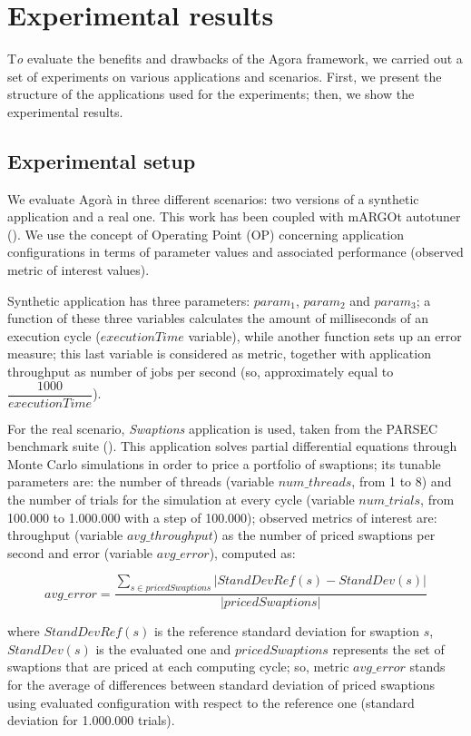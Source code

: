 \chapter{Experimental results}\label{exps}

\lettrine{T}{}\textit{o} evaluate the benefits and drawbacks of the Agora framework, we carried out a set of experiments on various applications and scenarios. First, we present the structure of the applications used for the experiments; then, we show the experimental results.

\section{Experimental setup}\label{expSetup}

We evaluate Agorà in three different scenarios: two versions of a synthetic application and a real one. This work has been coupled with mARGOt autotuner (\cite{gadioli2015application}). We use the concept of Operating Point (OP) concerning application configurations in terms of parameter values and associated performance (observed metric of interest values).

Synthetic application has three parameters: $param_1$, $param_2$ and $param_3$; a function of these three variables calculates the amount of milliseconds of an execution cycle ($executionTime$ variable), while another function sets up an error measure; this last variable is considered as metric, together with application throughput as number of jobs per second (so, approximately equal to $\dfrac{1000}{executionTime}$).

For the real scenario, \textit{Swaptions} application is 	used, taken from the PARSEC benchmark suite (\cite{bienia2008parsec}). This application solves partial differential equations through Monte Carlo simulations in order to price a portfolio of swaptions; its tunable parameters are: the number of threads (variable $num\_threads$, from 1 to 8) and the number of trials for the simulation at every cycle (variable $num\_trials$, from 100.000 to 1.000.000 with a step of 100.000); observed metrics of interest are: throughput (variable $avg\_throughput$) as the number of priced swaptions per second and error (variable $avg\_error$), computed as:

\[
avg\_error = \dfrac{\sum_{s \in pricedSwaptions} \left\vert StandDevRef(s) - StandDev(s) \right\vert}{\left\vert pricedSwaptions \right\vert}
\]

where $StandDevRef(s)$ is the reference standard deviation for swaption $s$, $StandDev(s)$ is the evaluated one and $pricedSwaptions$ represents the set of swaptions that are priced at each computing cycle; so, metric $avg\_error$ stands for the average of differences between standard deviation of priced swaptions using evaluated configuration with respect to the reference one (standard deviation for 1.000.000 trials).

